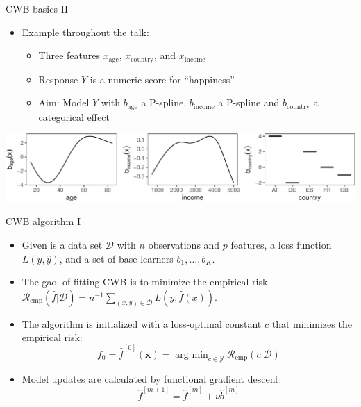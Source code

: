 \documentclass[ignorenonframetext,]{beamer}
\providecommand{\tightlist}{%
  \setlength{\itemsep}{0pt}\setlength{\parskip}{0pt}}
\newcommand{\D}{\mathcal{D}}
\newcommand{\fh}{\hat{f}}
\newcommand{\fmh}{\fh^{[m]}}
\newcommand{\blK}{K}
\newcommand{\xv}{\bm{x}}
\newcommand{\argmin}{\operatorname{arg~min}}
\newcommand{\riske}{\mathcal{R}_{\text{emp}}}
\begin{document}
\begin{frame}{CWB basics II}
\protect\hypertarget{cwb-basics-ii}{}
\begin{itemize}
\tightlist
\item
  Example throughout the talk:

  \begin{itemize}
  \tightlist
  \item
    Three features \(x_{\text{age}}\), \(x_{\text{country}}\), and
    \(x_{\text{income}}\)
  \item
    Response \(Y\) is a numeric score for ``happiness''
  \item
    Aim: Model \(Y\) with \(b_{\text{age}}\) a P-spline,
    \(b_{\text{income}}\) a P-spline and \(b_{\text{country}}\) a
    categorical effect
  \end{itemize}
\end{itemize}

\begin{center}\includegraphics{figures/unnamed-chunk-1-1} \end{center}
\end{frame}

\begin{frame}{CWB algorithm I}
\protect\hypertarget{cwb-algorithm-i}{}
\begin{itemize}
\tightlist
\item
  Given is a data set \(\D\) with \(n\) observations and \(p\) features,
  a loss function \(L(y, \hat{y})\), and a set of base learners
  \(b_1, \dots, b_\blK\).
\item
  The gaol of fitting CWB is to minimize the empirical risk
  \(\riske(\fh | \D) = n^{-1}\sum_{(x,y)\in\D} L(y, \fh(x))\).
\item
  The algorithm is initialized with a loss-optimal constant \(c\) that
  minimizes the empirical risk:
  \[f_0 = \fh^{[0]}(\xv) = \argmin_{c\in\mathcal{Y}}\riske(c|\D)\]
\item
  Model updates are calculated by functional gradient descent:
  \[\fh^{[m+1]} = \fmh + \nu \hat{b}^{[m]}\]
\end{itemize}
\end{frame}
\end{document}
